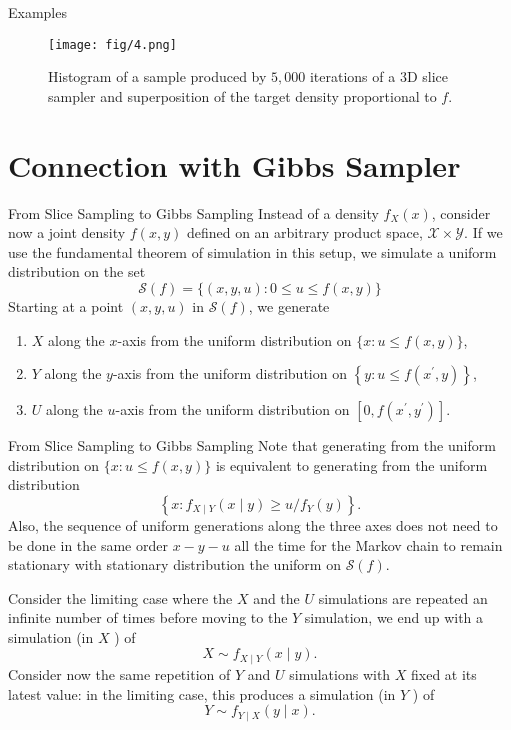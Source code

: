 \documentclass{beamer}
\begin{document}
\begin{frame}{Examples}
	\begin{figure}[htbp]
		\texttt{[image: fig/4.png]}
		\caption{Histogram of a sample produced by $5,000$ iterations of a 3D slice sampler and superposition of the target density proportional to $f$.}
	\end{figure}
\end{frame}

\section{Connection with Gibbs Sampler}
\begin{frame}{\large From Slice Sampling to Gibbs Sampling} 
	\small
	Instead of a density $f_{X}(x)$, consider now a joint density $f(x, y)$ defined on an arbitrary product space, $\mathscr{X} \times \mathscr{Y} .$ If we use the fundamental theorem of simulation in this setup, we simulate a uniform distribution on the set
	$$
	\mathscr{S}(f)=\{(x, y, u): 0 \leq u \leq f(x, y)\}
	$$
	Starting at a point $(x, y, u)$ in $\mathscr{S}(f)$, we generate
	\begin{enumerate}
	\item $X$ along the $x$-axis from the uniform distribution on $\{x: u \leq f(x, y)\}$,
\item $Y$ along the $y$-axis from the uniform distribution on $\left\{y: u \leq f\left(x^{\prime}, y\right)\right\}$,
\item $U$ along the $u$-axis from the uniform distribution on $\left[0, f\left(x^{\prime}, y^{\prime}\right)\right]$.
	\end{enumerate}

\end{frame}
\begin{frame}{\large From Slice Sampling to Gibbs Sampling}
		\small
	Note that generating from the uniform distribution on $\{x: u \leq f(x, y)\}$ is equivalent to generating from the uniform distribution
	$$
	\left\{x: f_{X \mid Y}(x \mid y) \geq u / f_{Y}(y)\right\}.
	$$
	Also, the sequence of uniform generations along the three axes does not need to be done in the same order $x-y-u$ all the time for the Markov chain to remain stationary with stationary distribution the uniform on $\mathscr{S}(f)$.
	
	Consider the limiting case where the $X$ and the $U$ simulations are repeated an infinite number of times before moving to the $Y$ simulation, we end up with a simulation (in $X$ ) of $$
	X \sim f_{X \mid Y}(x \mid y).
	$$
	Consider now the same repetition of $Y$ and $U$ simulations with $X$ fixed at its latest value: in the limiting case, this produces a simulation (in $Y$ ) of
	$$
	Y \sim f_{Y \mid X}(y \mid x) .
	$$
\end{frame}
\end{document}
